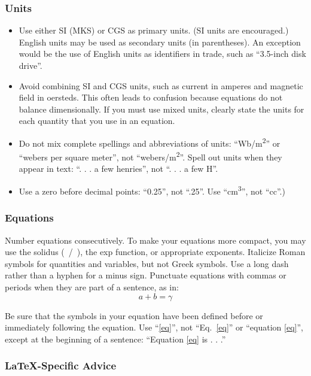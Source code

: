 \documentclass[conference]{IEEEtran}
\begin{document}
\subsubsection{Units}
\begin{itemize}
\item Use either SI (MKS) or CGS as primary units. (SI units are encouraged.) English units may be used as secondary units (in parentheses). An exception would be the use of English units as identifiers in trade, such as ``3.5-inch disk drive''.
\item Avoid combining SI and CGS units, such as current in amperes and magnetic field in oersteds. This often leads to confusion because equations do not balance dimensionally. If you must use mixed units, clearly state the units for each quantity that you use in an equation.
\item Do not mix complete spellings and abbreviations of units: ``Wb/m\textsuperscript{2}'' or ``webers per square meter'', not ``webers/m\textsuperscript{2}''. Spell out units when they appear in text: ``. . . a few henries'', not ``. . . a few H''.
\item Use a zero before decimal points: ``0.25'', not ``.25''. Use ``cm\textsuperscript{3}'', not ``cc''.)
\end{itemize}

\subsubsection{Equations}
Number equations consecutively. To make your 
equations more compact, you may use the solidus (~/~), the exp function, or 
appropriate exponents. Italicize Roman symbols for quantities and variables, 
but not Greek symbols. Use a long dash rather than a hyphen for a minus 
sign. Punctuate equations with commas or periods when they are part of a 
sentence, as in:
\begin{equation}
a+b=\gamma\label{eq}
\end{equation}

Be sure that the 
symbols in your equation have been defined before or immediately following 
the equation. Use ``\eqref{eq}'', not ``Eq.~\eqref{eq}'' or ``equation \eqref{eq}'', except at 
the beginning of a sentence: ``Equation \eqref{eq} is . . .''

\subsubsection{\LaTeX-Specific Advice}
\end{document}
